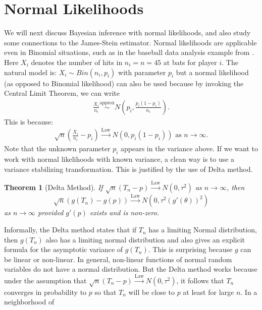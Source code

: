 \documentclass{scrartcl}
\newtheorem{theorem}{Theorem}[section]
\begin{document}
\section{Normal Likelihoods}
We will next discuss Bayesian inference with normal likelihoods, and
also study some connections to the James-Stein estimator. Normal
likelihoods are applicable even in Binomial situations, such as in the
baseball data analysis example from \citet[Chapter 1]{Efron}. Here
$X_i$ denotes the number of hits in $n_i = n = 45$ at bats for player
$i$. The natural model is: $X_i \sim Bin(n_i, p_i)$ with parameter
$p_i$ but a normal likelihood (as opposed to Binomial likelihood) can
also be used because by invoking the Central Limit Theorem, we can
write
\begin{align*}
  \frac{X_i}{n_i} \overset{\text{approx}}{\sim} N\left(p_i,
  \frac{p_i(1-p_i)}{n_i} \right). 
\end{align*}
This is because:
\begin{align}\label{clt}
  \sqrt{n} \left(\frac{X_i}{n_i} - p_i \right)
  \overset{\text{Law}}{\rightarrow} N(0, p_i(1 - p_i)) \text{  as } n
  \rightarrow \infty. 
\end{align}
Note that the unknown parameter $p_i$ appears in the variance
above. If we want to work with normal likelihoods with known variance,
a clean way is to use a variance stabilizing transformation. This is
justified by the use of Delta method.
\begin{theorem}[Delta Method]
  If $\sqrt{n}(T_n - p) \overset{\text{Law}}{\rightarrow} N(0,
  \tau^2)$ as $n \rightarrow \infty$, then
  \begin{equation*}
    \sqrt{n} \left(g(T_n) - g(p) \right)
    \overset{\text{Law}}{\rightarrow} N(0, \tau^2 (g'(\theta))^2) 
  \end{equation*}
  as $n \rightarrow \infty$ provided $g'(p)$ exists and is
  non-zero.  
\end{theorem}
Informally, the Delta method states that if $T_n$ has a limiting
Normal distribution, then $g(T_n)$ also has  a limiting normal
distribution and also gives an explicit  formula for the asymptotic
variance of $g(T_n)$. This is surprising because $g$ can be linear or
non-linear. In general, non-linear functions of normal random
variables do not have a normal distribution. But the Delta method
works because under the assumption that $\sqrt{n}(T_n - p) \overset{\text{Law}}{\rightarrow}
N(0, \tau^2)$, it follows that $T_n$  converges in probability to
$p$ so that $T_n$ will be close to $p$ at least for large $n$. In a neighborhood of
\end{document}
